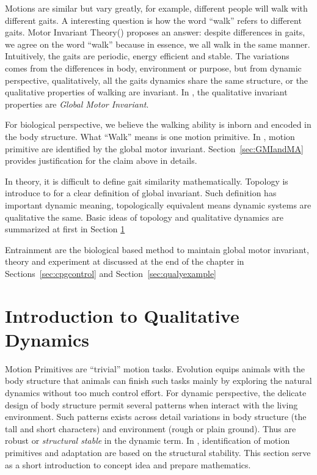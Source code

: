 Motions are similar but vary greatly, for example, different people will walk with different gaits. 
A interesting question  is how the word ``walk'' refers to different gaits.
Motor Invariant Theory(\moit) proposes an answer:  despite differences in gaits, we agree on the word ``walk''  because in essence, we all walk in the same manner.
Intuitively, the gaits are periodic, energy efficient and stable.
The variations comes from the differences in body, environment or purpose, but from dynamic perspective, qualitatively, all the gaits dynamics share the same structure, or the qualitative properties of walking are invariant.
In \moit, the qualitative invariant properties are \emph{Global Motor Invariant}.


For biological perspective, we believe the walking ability is inborn and encoded in the body structure.
What ``Walk'' means is one motion primitive.
In \moit, motion primitive are identified by the global motor invariant.
Section~\ref{sec:GMIandMA} provides justification for the claim above in details.


In theory, it is difficult to define gait similarity mathematically.
Topology is introduce to for a clear definition of global invariant.
Such definition has important dynamic meaning, topologically equivalent means dynamic systems are qualitative the same.
Basic ideas of topology and qualitative dynamics are summarized at first in Section \ref{sec:qualiDy}

Entrainment are the biological based method to maintain global motor invariant, theory and experiment at discussed at the end of the chapter in Sections~\ref{sec:cpgcontrol} and Section~\ref{sec:qualyexample}







\section{Introduction to Qualitative Dynamics}
\label{sec:qualiDy}
Motion Primitives are ``trivial'' motion tasks.
Evolution equips animals with the body structure that animals can finish such tasks mainly by exploring the natural dynamics without too much control effort.
For dynamic perspective, the delicate design of body structure permit several patterns when interact with the living environment.  
Such patterns exists across detail variations in body structure (the tall and short characters) and environment (rough or plain ground).
Thus are robust or \emph{structural stable} in the dynamic term.
In \moit, identification of motion primitives and adaptation are based on the structural stability.
This section serve as a short introduction to concept idea and prepare mathematics.


